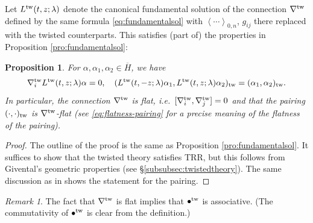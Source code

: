 \documentclass[11pt]{amsart}
\newtheorem{pro}[thm]{Proposition} %
\theoremstyle{definition} %
\theoremstyle{remark} %
\newtheorem{rem}[thm]{Remark}%
\newcommand{\tw}{{\rm tw}}
\def\corr#1{\left\langle #1 \right\rangle}
\newcommand{\look}[1]{\marginpar{\bf \tiny #1}}
\newcommand{\ov}{\overline}
\begin{document}
Let $L^\tw(t,z;\lambda)$ denote the canonical fundamental solution 
of the connection $\nabla^\tw$ defined by the same formula 
\eqref{eq:fundamentalsol} with $\corr{\cdots}_{0,n}$, $g_{ij}$ 
there replaced with the twisted counterparts. 
This satisfies (part of) the properties in 
Proposition \ref{pro:fundamentalsol}: 
\begin{pro} 
\label{pro:twisted-fundsol} 
For $\alpha, \alpha_1,\alpha_2 \in \ov{H}$, we have 
\[
\nabla^{\tw}_i L^\tw(t,z;\lambda) \alpha = 0, 
\quad 
(L^\tw(t,-z;\lambda) \alpha_1, L^\tw(t,z;\lambda)\alpha_2)_\tw 
= (\alpha_1,\alpha_2)_\tw.  
\]
In particular, the connection $\nabla^\tw$ is flat, 
i.e.~$[\nabla^{\tw}_i, \nabla^{\tw}_j] =0$  
and that the pairing $(\cdot,\cdot)_{\tw}$ is 
$\nabla^{\tw}$-flat (see \eqref{eq:flatness-pairing} 
for a precise meaning of the flatness of the pairing). 
\end{pro} 
\begin{proof} 
The outline of the proof is the same as 
Proposition \ref{pro:fundamentalsol}. 
It suffices to show that the twisted theory satisfies TRR, 
but this follows from Givental's geometric properties 
(see \S \ref{subsubsec:twistedtheory}). 
The same discussion as in \cite[Proposition 2.1]{Iritani:period} 
shows the statement for the pairing. 
\end{proof} 

\begin{rem} 
The fact that $\nabla^{\rm tw}$ 
is flat implies that $\bullet^\tw$ is associative. 
(The commutativity of $\bullet^{\tw}$ is clear from 
the definition.)
\end{rem} 
\end{document}
